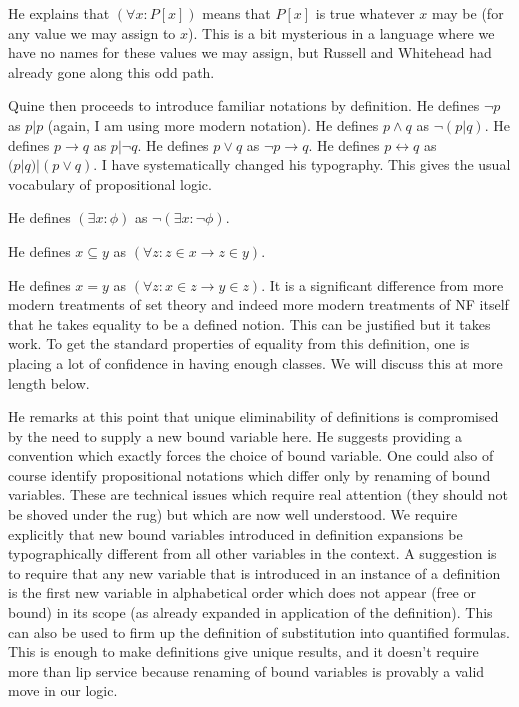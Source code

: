 \documentclass[12pt]{article}
\begin{document}
He explains that $(\forall x:P[x])$ means that $P[x]$ is true whatever $x$ may be (for any value we may assign to $x$).  This is a bit mysterious in a language where we have no names for these values we may assign, but Russell and Whitehead had already gone along this odd path.

Quine then proceeds to introduce familiar notations by definition.  He defines $\neg p$ as $p|p$ (again, I am using more modern notation).  He defines $p \wedge q$ as $\neg(p|q)$.  He defines $p \rightarrow q$ as $p|\neg q$.  He defines $p\vee q$ as $\neg p \rightarrow q$.  He defines $p \leftrightarrow q$ as $(p|q)|(p \vee q)$.  I have systematically changed his typography.  This gives the usual vocabulary of propositional logic.

He defines $(\exists x:\phi)$ as $\neg(\exists x:\neg \phi)$.

He defines $x \subseteq y$ as $(\forall z:z \in x \rightarrow z \in y)$.

He defines $x=y$ as $(\forall z:x \in z \rightarrow y \in z)$.  It is a significant difference from more modern treatments of set theory and indeed more modern treatments of NF itself that he takes equality to be a defined notion.  This can be justified but it takes work.  To get the standard properties of equality from this definition, one is placing a lot of confidence in having enough classes.  We will discuss this at more length below.

He remarks at this point that unique eliminability of definitions is compromised by the need to supply a new bound variable here.  He suggests providing a convention which exactly forces the choice of bound variable.  One could also of course identify propositional notations which differ only by renaming of bound variables.   These are technical issues which require real attention (they should not be shoved under the rug) but which are now well understood.  We require explicitly that new bound variables introduced in definition expansions be typographically different from all other variables in the context.  A suggestion is to require that any new variable that is introduced in an instance of a definition is the first new variable in alphabetical order which does not appear (free or bound) in its scope (as already expanded in application of the definition).  This can also be used to firm up the definition of substitution into quantified formulas.  This is enough to make definitions give unique results, and it doesn't require more than lip service because renaming of bound variables is provably a valid move in our logic.
\end{document}

